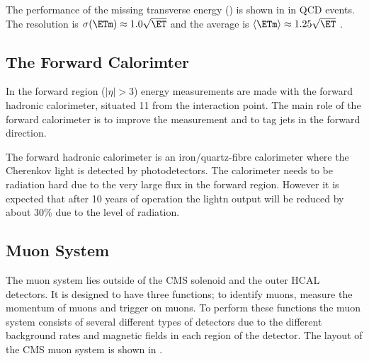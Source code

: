 The performance of the missing transverse energy (\ETm) is shown in
 in QCD events. The \ETm resolution is
$\sigma(\ETm) \approx 1.0 \sqrt \ET$ and the average \ETm is 
$\langle \ETm \rangle \approx 1.25 \sqrt \ET$ \cite{chatrchyan2008cms}.

\subsection{The Forward Calorimter}
In the forward region ($|\eta| > 3$) energy measurements are made with the
forward hadronic calorimeter, situated \unit{11}{\meter} from the interaction
point. The main role of the forward calorimeter is to improve the \ETm
measurement and to tag jets in the forward direction.

The forward hadronic calorimeter is an iron/quartz-fibre calorimeter where the
Cherenkov light is detected by photodetectors.  The calorimeter needs to be
radiation hard due to the very large flux in the forward region. However it is
expected that after 10 years of operation the lightn output will be reduced by
about \unit{30}{\%} due to the level of radiation.

\subsection{Muon System}
The muon system lies outside of the CMS solenoid and the outer HCAL detectors.
It is designed to have three functions; to identify muons, measure the momentum
of muons and trigger on muons. To perform these functions the muon system
consists of several different types of detectors due to the different background
rates and magnetic fields in each region of the detector.
The layout of the {CMS} muon system is shown in .

